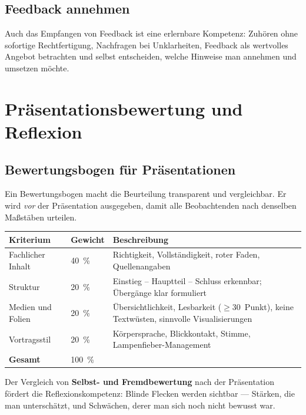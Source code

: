 \documentclass[11pt, a4paper]{article}
\begin{document}
\subsection{Feedback annehmen}

Auch das Empfangen von Feedback ist eine erlernbare Kompetenz:
Zuhören ohne sofortige Rechtfertigung, Nachfragen bei Unklarheiten,
Feedback als wertvolles Angebot betrachten und selbst entscheiden,
welche Hinweise man annehmen und umsetzen möchte.

\section{Präsentationsbewertung und Reflexion}

\subsection{Bewertungsbogen für Präsentationen}

Ein Bewertungsbogen macht die Beurteilung transparent und vergleichbar.
Er wird \emph{vor} der Präsentation ausgegeben, damit alle Beobachtenden nach denselben
Maßstäben urteilen.

\begin{center}
\begin{tabular}{p{4.5cm} p{1.5cm} p{7.5cm}}
\toprule
\textbf{Kriterium} & \textbf{Gewicht} & \textbf{Beschreibung}\\
\midrule
Fachlicher Inhalt & 40~\% & Richtigkeit, Vollständigkeit, roter Faden, Quellenangaben\\
\addlinespace
Struktur & 20~\% & Einstieg -- Hauptteil -- Schluss erkennbar; Übergänge klar formuliert\\
\addlinespace
Medien und Folien & 20~\% & Übersichtlichkeit, Lesbarkeit ($\geq$30~Punkt), keine Textwüsten,
                              sinnvolle Visualisierungen\\
\addlinespace
Vortragsstil & 20~\% & Körpersprache, Blickkontakt, Stimme, Lampenfieber-Management\\
\midrule
\textbf{Gesamt} & 100~\% & \\
\bottomrule
\end{tabular}
\end{center}

Der Vergleich von \textbf{Selbst- und Fremdbewertung} nach der Präsentation fördert die
Reflexionskompetenz: Blinde Flecken werden sichtbar --- Stärken, die man unterschätzt,
und Schwächen, derer man sich noch nicht bewusst war.
\end{document}
